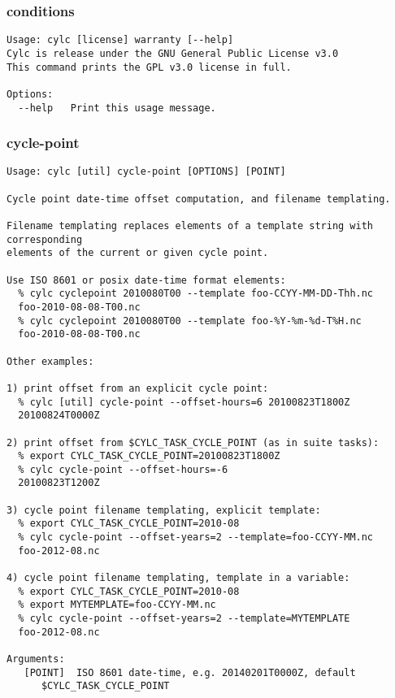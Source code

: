 \subsubsection{conditions}
\label{conditions}
\begin{lstlisting}
Usage: cylc [license] warranty [--help]
Cylc is release under the GNU General Public License v3.0
This command prints the GPL v3.0 license in full.

Options:
  --help   Print this usage message.
\end{lstlisting}
\subsubsection{cycle-point}
\label{cycle-point}
\begin{lstlisting}
Usage: cylc [util] cycle-point [OPTIONS] [POINT]

Cycle point date-time offset computation, and filename templating.

Filename templating replaces elements of a template string with corresponding
elements of the current or given cycle point.

Use ISO 8601 or posix date-time format elements:
  % cylc cyclepoint 2010080T00 --template foo-CCYY-MM-DD-Thh.nc
  foo-2010-08-08-T00.nc
  % cylc cyclepoint 2010080T00 --template foo-%Y-%m-%d-T%H.nc
  foo-2010-08-08-T00.nc

Other examples:

1) print offset from an explicit cycle point:
  % cylc [util] cycle-point --offset-hours=6 20100823T1800Z
  20100824T0000Z

2) print offset from $CYLC_TASK_CYCLE_POINT (as in suite tasks):
  % export CYLC_TASK_CYCLE_POINT=20100823T1800Z
  % cylc cycle-point --offset-hours=-6
  20100823T1200Z

3) cycle point filename templating, explicit template:
  % export CYLC_TASK_CYCLE_POINT=2010-08
  % cylc cycle-point --offset-years=2 --template=foo-CCYY-MM.nc
  foo-2012-08.nc

4) cycle point filename templating, template in a variable:
  % export CYLC_TASK_CYCLE_POINT=2010-08
  % export MYTEMPLATE=foo-CCYY-MM.nc
  % cylc cycle-point --offset-years=2 --template=MYTEMPLATE
  foo-2012-08.nc

Arguments:
   [POINT]  ISO 8601 date-time, e.g. 20140201T0000Z, default
      $CYLC_TASK_CYCLE_POINT


\end{lstlisting}
